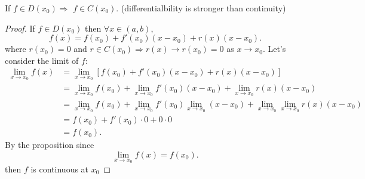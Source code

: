 \documentclass[a4paper]{article}
\begin{document}
\begin{prop}
  If $f \in D(x_0) \Rightarrow$ $f \in C(x_0)$. (differentialbility is stronger than continuity)

  \begin{proof}
    If $f \in D(x_0)$ then $\forall x \in (a,b)$, 
     \[
    f(x) = f(x_0) + f'(x_0) (x - x_0) + r(x) (x-x_0)
    .\]
    where $ r(x_0) = 0$ and $r \in C(x_0) \Rightarrow r(x) \to r(x_0) = 0 $ as $x \to x_0$. Let's consider the limit of $f$:
    \begin{align*}
      \lim_{x \to x_0} f(x) &= \lim_{x \to x_0} [f(x_0) + f'(x_0) (x-x_0) + r(x) (x-x_0)] \\
                            &= \lim_{x \to x_0} f(x_0) + \lim_{x \to x_0} f'(x_0) (x-x_0) + \lim_{x \to x_0} r(x) (x- x_0) \\
                            &= \lim_{x \to x_0} f(x_0) + \lim_{x \to x_0} f'(x_0) \lim_{x \to x_0}  (x-x_0) + \lim_{x \to x_0} \lim_{x \to x_0}r(x) (x- x_0) \\
                            &= f(x_0) + f'(x_0) \cdot 0 + 0 \cdot 0 \\
                            &= f(x_0)
    .\end{align*}
    By the proposition since 
    \[
    \lim_{x \to x_0} f(x) = f(x_0)
    .\] 
    then $f$ is continuous at $x_0$ 
  \end{proof}
\end{prop}
\end{document}
